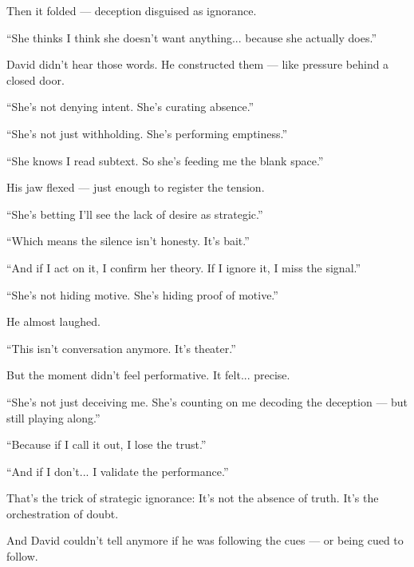 \medskip




Then it folded — deception disguised as ignorance.

“She thinks I think she doesn’t want anything... because she actually does.”

David didn’t hear those words.
He constructed them — like pressure behind a closed door.

“She’s not denying intent. She’s curating absence.”

“She’s not just withholding. She’s performing emptiness.”

“She knows I read subtext. So she’s feeding me the blank space.”

His jaw flexed — just enough to register the tension.

“She’s betting I’ll see the lack of desire as strategic.”

“Which means the silence isn’t honesty. It’s bait.”

“And if I act on it, I confirm her theory. If I ignore it, I miss the signal.”

“She’s not hiding motive. She’s hiding proof of motive.”

He almost laughed.

“This isn’t conversation anymore. It’s theater.”

But the moment didn’t feel performative. It felt... precise.

“She’s not just deceiving me. She’s counting on me decoding the deception — but still playing along.”

“Because if I call it out, I lose the trust.”

“And if I don’t... I validate the performance.”

That’s the trick of strategic ignorance:
It’s not the absence of truth.
It’s the orchestration of doubt.

And David couldn’t tell anymore if he was following the cues —
or being cued to follow.

\medskip

